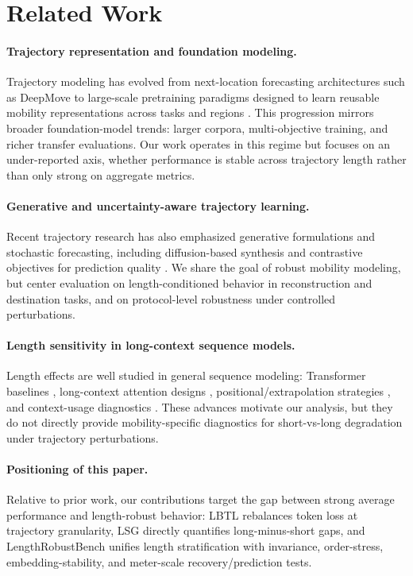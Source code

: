 \documentclass{article}
\begin{document}
\section{Related Work}
\paragraph{Trajectory representation and foundation modeling.}
Trajectory modeling has evolved from next-location forecasting architectures such as DeepMove \citep{feng2018deepmove} to large-scale pretraining paradigms designed to learn reusable mobility representations across tasks and regions \citep{zhang2023regions,lin2024trajfm,ma2024jgrm,choudhury2024trajectory,zhu2025unitraj}. This progression mirrors broader foundation-model trends: larger corpora, multi-objective training, and richer transfer evaluations. Our work operates in this regime but focuses on an under-reported axis, whether performance is stable across trajectory length rather than only strong on aggregate metrics.

\paragraph{Generative and uncertainty-aware trajectory learning.}
Recent trajectory research has also emphasized generative formulations and stochastic forecasting, including diffusion-based synthesis \citep{zhu2023difftraj} and contrastive objectives for prediction quality \citep{yao2024trajclip}. We share the goal of robust mobility modeling, but center evaluation on length-conditioned behavior in reconstruction and destination tasks, and on protocol-level robustness under controlled perturbations.

\paragraph{Length sensitivity in long-context sequence models.}
Length effects are well studied in general sequence modeling: Transformer baselines \citep{vaswani2017attention}, long-context attention designs \citep{beltagy2020longformer,zaheer2020bigbird}, positional/extrapolation strategies \citep{su2021roformer,press2022trainshort}, and context-usage diagnostics \citep{liu2024lost}. These advances motivate our analysis, but they do not directly provide mobility-specific diagnostics for short-vs-long degradation under trajectory perturbations.

\paragraph{Positioning of this paper.}
Relative to prior work, our contributions target the gap between strong average performance and length-robust behavior: LBTL rebalances token loss at trajectory granularity, LSG directly quantifies long-minus-short gaps, and LengthRobustBench unifies length stratification with invariance, order-stress, embedding-stability, and meter-scale recovery/prediction tests.
\end{document}
